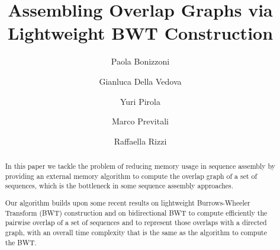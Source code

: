 \documentclass[runningheads,envcountsame,a4paper]{llncs}
\newcommand{\etal}{\textit{et al.}\xspace}
\begin{document}
\title{Assembling Overlap Graphs via Lightweight BWT Construction}

\author{%
  Paola Bonizzoni \and
  Gianluca Della Vedova \and
  Yuri Pirola \and
  Marco Previtali \and
  Raffaella Rizzi
}
\authorrunning{Bonizzoni \etal}


\maketitle


\begin{abstract}
In this paper we tackle the problem of reducing memory usage in sequence
assembly by providing an external memory algorithm to compute the overlap graph of
a set of sequences, which is the bottleneck in some sequence assembly approaches.

Our algorithm builds upon some recent results on lightweight Burrows-Wheeler
Transform (BWT) construction and on bidirectional BWT to compute efficiently the
pairwise overlap of a set of sequences and to represent those overlaps with a
directed graph, with an overall time complexity that is the same as the
algorithm to compute the BWT.
\end{abstract}

\begin{comment}
\section*{Legenda di supporto per la correzione}
\begin{itemize}
\item $n$: cardinality of the collection $R$
\item $\alpha$: extension string between overlapping reads
\item $w$: number of extensions of a BWT interval with some $\sigma$
\item \emph{length} of a $Q$-interval: length of $Q$
\item \emph{width} of a $Q$-interval $[b,e)$: difference $(e-b)$
\item $\$$-width $w_{\$}$: width of the $Q'\$$-interval inside a $Q'$-interval that is a prefix-interval (old \emph{dimension})
\item \emph{length} of an extension pair: $|S|$ + $|E|$ + $1$ (the old \emph{dimension})
\item $\mathcal{P}$: list of the prefix-intervals computed at each iteration (the old $\mathcal{T}$)
\item $C(\sigma)$: FM-index function (the old $C(\sigma, R)$)
\item $Occ(\sigma, i)$: FM-index function (the old $Occ(\sigma, i, R)$)
\item prefix-interval: $rev(Q)$-interval (on $B'$) representing a string $Q$ occurring as a prefix (the old $P$-interval denotes in this framework an interval representing a string $P$)
\end{itemize}
\end{comment}
\end{document}
